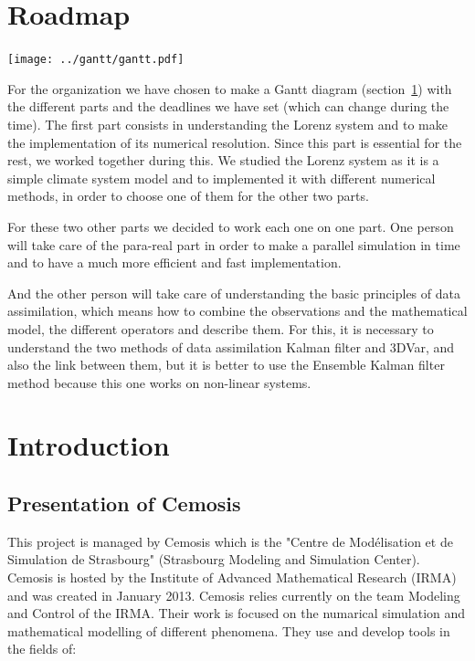 \documentclass[12pt]{article}
\begin{document}
	\nocite{*}
	
	
	
	\tableofcontents
	
    \newpage
	\section{Roadmap}
	    \label{diag}
	    
	\begin{center}
		\texttt{[image: ../gantt/gantt.pdf]}
	\end{center}
	
	\noindent For the organization we have chosen to make a Gantt diagram (section~\ref{diag}) with the different parts and the deadlines we have set (which can change during the time). The first part consists in understanding the Lorenz system and to make the implementation of its numerical resolution. Since this part is essential for the rest, we worked together during this.
	We studied the Lorenz system as it is a simple climate system model and to implemented it with different numerical methods, in order to choose one of them for the other two parts. 
	
	
	\noindent For these two other parts we decided to work each one on one part. One person will take care of the para-real part in order to make a parallel simulation in time and to have a much more efficient and fast implementation.
	
	
    \noindent And the other person will take care of understanding the basic principles of data assimilation, which means how to combine the observations and the mathematical model, the different operators and describe them. For this, it is necessary to understand the two methods of data assimilation Kalman filter and 3DVar, and also the link between them, but it is better to use the Ensemble Kalman filter method because this one works on non-linear systems.


	\section{Introduction}
	
	\subsection{Presentation of Cemosis}
	
	This project is managed by Cemosis which is the "Centre de Modélisation et de Simulation de Strasbourg" (Strasbourg Modeling and Simulation Center). Cemosis is hosted by the Institute of Advanced Mathematical Research (IRMA) and was created in January 2013. Cemosis relies currently on the team Modeling and Control of the IRMA. Their work is focused on the numarical simulation and mathematical modelling of different phenomena. They use and develop tools in the fields of:
	
\end{document}
